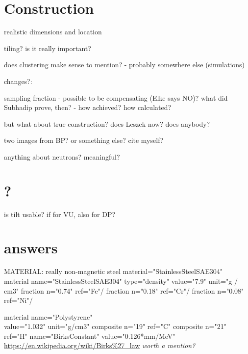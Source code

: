 \section{Construction}
realistic dimensions and location

tiling? is it really important?

does clustering make sense to mention? - probably somewhere else (simulations)

changes?:

sampling fraction - possible to be compensating (Elke says NO)? what did Subhadip prove, then? - how achieved? how calculated?

but what about true construction? does Leszek now? does anybody?

two images from BP? or something else? cite myself?

anything about neutrons? meaningful?

\section{?}
is tilt usable? if for VU, also for DP?

\section{answers}

MATERIAL:
really non-magnetic steel material="StainlessSteelSAE304"\\
material name="StainlessSteelSAE304"
type="density" value="7.9" unit="g / cm3"
fraction n="0.74" ref="Fe"/
fraction n="0.18" ref="Cr"/
fraction n="0.08" ref="Ni"/

material name="Polystyrene"\\
value="1.032" unit="g/cm3"
composite n="19" ref="C"
composite n="21" ref="H"
name="BirksConstant" value="0.126*mm/MeV"\\
\url{https://en.wikipedia.org/wiki/Birks%27_law} \textit{worth a mention?}



